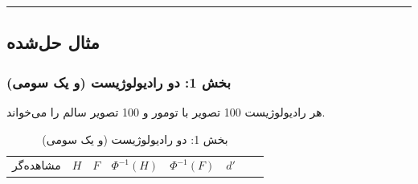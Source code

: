 \begin{center}\rule{0.5\linewidth}{0.5pt}\end{center}


\subsection{مثال حل‌شده}

\subsubsection{بخش 1: دو رادیولوژیست (و یک سومی)}

هر رادیولوژیست 100 تصویر با تومور و 100 تصویر سالم را می‌خواند.

\begin{landscape}\small
\begin{longtable}[]{@{}
  >{\raggedright\arraybackslash}p{}
  >{\raggedright\arraybackslash}p{}
  >{\raggedright\arraybackslash}p{}
  >{\raggedright\arraybackslash}p{}
  >{\raggedright\arraybackslash}p{}
  >{\raggedright\arraybackslash}p{}
  >{\raggedright\arraybackslash}p{}
  >{\raggedright\arraybackslash}p{}@{}}
\caption{\centering بخش 1: دو رادیولوژیست (و یک سومی)}\tabularnewline
\toprule\noalign{}
\begin{minipage}[b]{\linewidth}\raggedright
مشاهده‌گر
\end{minipage} & \begin{minipage}[b]{\linewidth}\raggedright
\(H\)
\end{minipage} & \begin{minipage}[b]{\linewidth}\raggedright
\(F\)
\end{minipage} & \begin{minipage}[b]{\linewidth}\raggedright
\(\Phi^{-1}(H)\)
\end{minipage} & \begin{minipage}[b]{\linewidth}\raggedright
\(\Phi^{-1}(F)\)
\end{minipage} & \begin{minipage}[b]{\linewidth}\raggedright
\(d'\)
\end{minipage} & \begin{minipage}[b]{\linewidth}\raggedright

\end{minipage}
\end{longtable}
\end{landscape}
